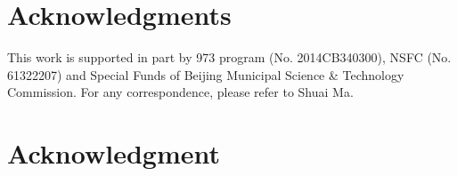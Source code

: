 \documentclass[10pt,journal,compsoc]{IEEEtran}
\begin{document}




\ifCLASSOPTIONcompsoc
  \section*{Acknowledgments}
This work is supported in part by  973 program ({\small No. 2014CB340300}), NSFC ({\small No. 61322207}) and Special Funds of Beijing Municipal Science \& Technology Commission.
For any correspondence, please refer to Shuai Ma.

\else
  \section*{Acknowledgment}
\fi







\end{document}
